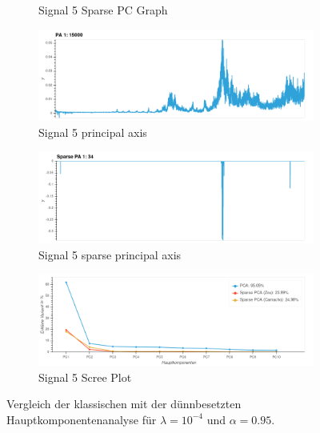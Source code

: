 \begin{figure}
\begin{subfigure}{0.45\textwidth}
\caption{Signal 5 Sparse PC Graph}
\label{sparse_pca_classical_analysis_sparse_pc_graph}
\end{subfigure}
%
\begin{subfigure}{0.9\textwidth}
\centering
\includegraphics[width=\textwidth]{figures/Signal_5_principal_axis.png}
\caption{Signal 5 principal axis}
\label{sparse_pca_classical_analysis_principal_axis}
\end{subfigure}
%
\begin{subfigure}{0.9\textwidth}
\centering
\includegraphics[width=\textwidth]{figures/Signal_5_sparse_principal_axis.png}
\caption{Signal 5 sparse principal axis}
\label{sparse_pca_classical_analysis_sparse_principal_axis}
\end{subfigure}
%
\begin{subfigure}{0.9\textwidth}
\centering
\includegraphics[width = \textwidth]{figures/Signal_5_scree_plot_10.png}
\caption{Signal 5 Scree Plot}
\label{sparse_pca_classical_analysis_scree_plot}
\end{subfigure}
\caption{Vergleich der klassischen mit der dünnbesetzten Hauptkomponentenanalyse für $\lambda=10^{-4}$ und $\alpha = 0.95$.}
\label{sparse_pca_classical_analysis}
\end{figure}


